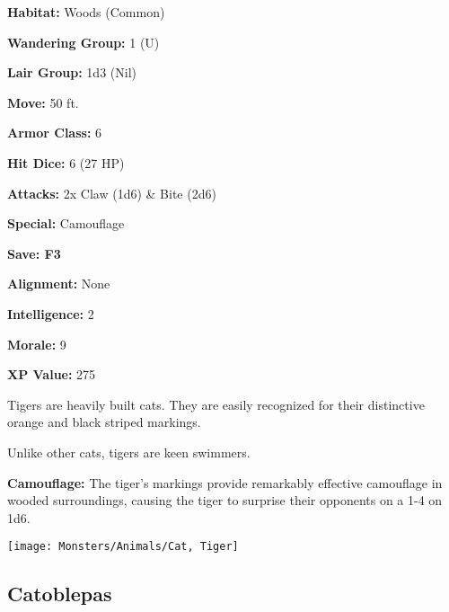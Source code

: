 \begin{multicols*}{2}
{\textbf{Habitat:} Woods (Common)

\textbf{Wandering Group:} 1 (U)

\textbf{Lair Group:} 1d3 (Nil)

\textbf{Move:} 50 ft.

\textbf{Armor Class:} 6

\textbf{Hit Dice:} 6 (27 HP)

\textbf{Attacks:} 2x Claw (1d6) \& Bite (2d6)

\textbf{Special:} Camouflage

\textbf{Save: F3}

\textbf{Alignment:} None

\textbf{Intelligence:} 2

\textbf{Morale:} 9

\textbf{XP Value:} 275}

Tigers are heavily built cats. They are easily recognized for their distinctive orange and black striped markings.

Unlike other cats, tigers are keen swimmers.

\textbf{Camouflage:} The tiger's markings provide remarkably effective camouflage in wooded surroundings, causing the tiger to surprise their opponents on a 1-4 on 1d6.

\texttt{[image: Monsters/Animals/Cat, Tiger]}

\subsection{Catoblepas}
\end{multicols*}
